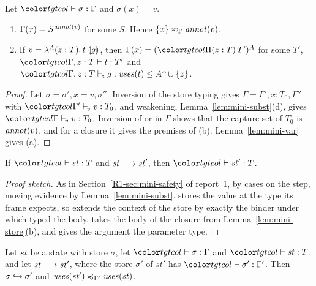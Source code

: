 \begin{lemma}\label{lem:mini-store}
Let $\storej{\sigma}{\Gamma}$ and $\sigma(x) = v$.
\begin{enumerate}
\item[(a)] $\Gamma(x) = \capt{S}{\annot{v}}$ for some $S$. Hence $\capeqv{\Gamma}{\cset{x}}{\annot{v}}$.
\item[(b)] If $v = \lamc{A}{z}{T}{t}{g}$, then $\Gamma(x) = \capt{(\pit[z]{T}{T'})}{A}$ for some $T'$, $\tmj{\Gamma, z : T}{t}{T'}$ and $\clej{\Gamma, z : T}{g}{\uses{t}}{\weak{A} \cup \cset{z}}$.
\end{enumerate}
\end{lemma}

\begin{proof}
Let $\sigma = \sigma', x = v, \sigma''$. Inversion of the store typing gives $\Gamma = \Gamma', x : T_0, \Gamma''$ with $\valj{\Gamma'}{v}{T_0}$, and weakening, Lemma~\ref{lem:mini-subst}(d), gives $\valj{\Gamma}{v}{T_0}$. Inversion of  or  in $\Gamma$ shows that the capture set of $T_0$ is $\annot{v}$, and for a closure it gives the premises of (b). Lemma~\ref{lem:mini-var} gives (a).
\end{proof}

\begin{theorem}[Preservation]\label{thm:mini-pres}
If $\statej{\mathit{st}}{T}$ and $\mathit{st} \step \mathit{st}'$, then $\statej{\mathit{st}'}{T}$.
\end{theorem}

\begin{proof}[Proof sketch]
As in Section~\ref{R1-sec:mini-safety} of report~1, by cases on the step, moving evidence by Lemma~\ref{lem:mini-subst}.  stores the value at the type its frame expects, so  extends the context of the store by exactly the binder under which  typed the body.  takes the body of the closure from Lemma~\ref{lem:mini-store}(b), and  gives the argument the parameter type.
\end{proof}

\begin{lemma}\label{lem:mini-step}
Let $\mathit{st}$ be a state with store $\sigma$, let $\storej{\sigma}{\Gamma}$ and $\statej{\mathit{st}}{T}$, and let $\mathit{st} \step \mathit{st}'$, where the store $\sigma'$ of $\mathit{st}'$ has $\storej{\sigma'}{\Gamma'}$. Then $\sext{\sigma}{\sigma'}$ and $\caple{\Gamma'}{\uses{\mathit{st}'}}{\uses{\mathit{st}}}$.
\end{lemma}

